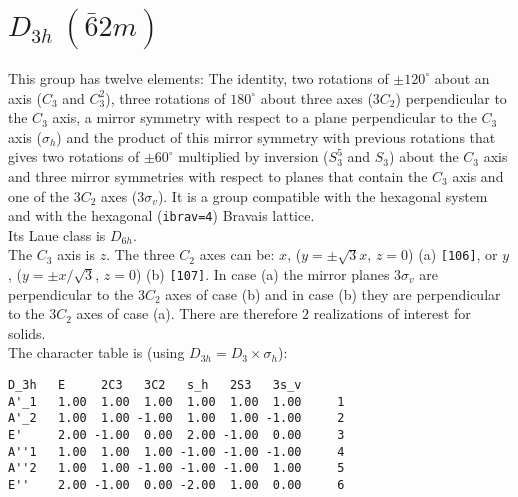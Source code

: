 \documentclass[12pt,a4paper,twoside]{report}
\begin{document}
\newpage
{\color{coral}\section{$D_{3h}\ (\bar 62m)$}} 
\color{black}
This group has twelve elements: The identity, two rotations of $\pm120^\circ$
about an axis ($C_3$ and $C_3^2$), three rotations of $180^\circ$
about three axes ($3C_2$) perpendicular to the $C_3$ axis,
a mirror symmetry with respect to a plane perpendicular to the $C_3$ axis 
($\sigma_h$) and the product of this mirror symmetry with previous rotations
that gives two rotations of $\pm 60^\circ$ multiplied by inversion 
($S_3^5$ and $S_3$) about the $C_3$ axis and three mirror symmetries with respect 
to planes that contain the $C_3$ axis and one of the $3C_2$ axes
($3\sigma_v$). 
It is a group compatible with the hexagonal system 
and with the hexagonal (\texttt{ibrav=4}) Bravais lattice. \\
Its Laue class is $D_{6h}$. \\
The $C_3$ axis is $z$.
The three $C_2$ axes can be: $x$, ($y=\pm \sqrt{3} x$, $z=0$) (a) 
\texttt{[106]}, or
$y$, ($y=\pm x/\sqrt{3}$, $z=0$) (b) \texttt{[107]}. 
In case (a) the mirror planes 
$3\sigma_v$ are perpendicular to the $3C_2$ axes of case (b) and in case (b) 
they are perpendicular to the $3C_2$ axes of case (a).
There are therefore $2$ realizations of interest for solids. \\
The character table is (using $D_{3h}=D_3 \times \sigma_h$):

\begin{tcolorbox}
\begin{footnotesize}
\begin{verbatim}
D_3h   E     2C3   3C2   s_h   2S3   3s_v 
A'_1   1.00  1.00  1.00  1.00  1.00  1.00     1
A'_2   1.00  1.00 -1.00  1.00  1.00 -1.00     2
E'     2.00 -1.00  0.00  2.00 -1.00  0.00     3
A''1   1.00  1.00  1.00 -1.00 -1.00 -1.00     4
A''2   1.00  1.00 -1.00 -1.00 -1.00  1.00     5
E''    2.00 -1.00  0.00 -2.00  1.00  0.00     6
\end{verbatim}
\end{footnotesize}
\end{tcolorbox}
\end{document}
